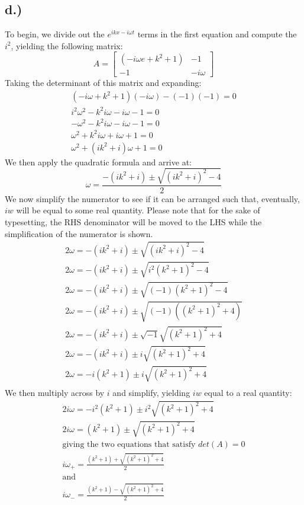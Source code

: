 \documentclass{article}
\begin{document}
\subsection*{d.)}
To begin, we divide out the $e^{ikx - i\omega t}$ terms in the first equation and compute the $i^2$, yielding the following matrix:
\[
A =
\begin{bmatrix}
(-i\omega e + k^2 + 1) & -1\\
-1 & -i\omega
\end{bmatrix}
\]
Taking the determinant of this matrix and expanding:
\begin{equation}
\begin{aligned}
(-i\omega + k^2 + 1)(-i\omega) - (-1)(-1) = 0\\
i^2\omega^2 - k^2i\omega - i\omega -1 = 0\\
-\omega^2 - k^2i\omega -i\omega -1 = 0\\
\omega^2 + k^2i\omega + i\omega + 1 = 0\\
\omega^2 + (ik^2 + i)\omega + 1 =0
\end{aligned}
\end{equation}
We then apply the quadratic formula and arrive at:
\begin{equation}
\omega = \frac{-(ik^2 + i) \pm \sqrt{(ik^2 + i)^2 -4}}{2}
\end{equation}
We now simplify the numerator to see if it can be arranged such that, eventually, $iw$ will be equal to some real quantity. Please note that for the sake of typesetting, the RHS denominator will be moved to the LHS while the simplification of the numerator is shown.
\begin{equation}
\begin{aligned}
2\omega = -(ik^2 + i) \pm \sqrt{(ik^2 + i)^2 -4}\\
2\omega = -(ik^2 + i) \pm \sqrt{i^2(k^2 + 1)^2 -4}\\
2\omega = -(ik^2 + i) \pm \sqrt{(-1)(k^2 + 1)^2 -4}\\
2\omega = -(ik^2 + i) \pm \sqrt{(-1)((k^2 + 1)^2 +4)}\\
2\omega = -(ik^2 + i) \pm \sqrt{-1}\sqrt{(k^2 + 1)^2 +4}\\
2\omega = -(ik^2 + i) \pm i\sqrt{(k^2 + 1)^2 +4}\\
2\omega = -i(k^2 + 1) \pm i\sqrt{(k^2 + 1)^2 +4}\\
\end{aligned}
\end{equation}
We then multiply across by $i$ and simplify, yielding $iw$ equal to a real quantity:
\begin{equation}
\begin{aligned}
2i\omega = -i^2(k^2 + 1) \pm i^2\sqrt{(k^2 + 1)^2 +4}\\
2i\omega = (k^2 + 1) \pm \sqrt{(k^2 + 1)^2 +4}\\
\text{giving the two equations that satisfy $det(A) = 0$}\\
i\omega_+ = \frac{(k^2 + 1) + \sqrt{(k^2 + 1)^2 +4}}{2}\\
\text{and}\\
i\omega_- = \frac{(k^2 + 1) - \sqrt{(k^2 + 1)^2 +4}}{2}\\
\end{aligned}
\end{equation}
\end{document}
